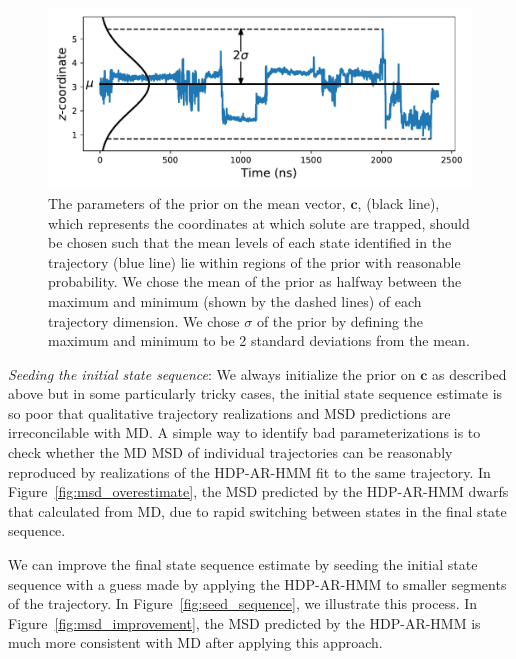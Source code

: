 \documentclass{article}
\begin{document}
  \begin{figure}[h]
  \centering
  \includegraphics[width=\textwidth]{prior_guesses.pdf}
  \caption{The parameters of the prior on the mean vector, $\mathbf{c}$, (black line), which
  represents the coordinates at which solute are trapped, should be chosen such
  that the mean levels of each state identified in the trajectory (blue line) lie within
  regions of the prior with reasonable probability. We chose the mean of the prior 
  as halfway between the maximum and minimum (shown by the dashed lines) of each trajectory dimension. We chose 
  $\sigma$ of the prior by defining the maximum and minimum to be 2 standard deviations
  from the mean.}\label{fig:prior_guesses}
  \end{figure}
  
  \textit{Seeding the initial state sequence}: We always initialize the prior on
  $\mathbf{c}$ as described above but in some 
  particularly tricky cases, the initial state sequence estimate is so poor that
  qualitative trajectory realizations and MSD predictions are irreconcilable with
  MD. A simple way to identify bad parameterizations is to check whether the MD 
  MSD of individual trajectories can be reasonably reproduced by realizations of
  the HDP-AR-HMM fit to the same trajectory. In Figure~\ref{fig:msd_overestimate},
  the MSD predicted by the HDP-AR-HMM dwarfs that calculated from MD, due to 
  rapid switching between states in the final state sequence.
  
  We can improve the final state sequence estimate by seeding the initial state 
  sequence with a guess made by applying the HDP-AR-HMM to smaller segments of the 
  trajectory. In Figure~\ref{fig:seed_sequence}, we illustrate this process. In
  Figure~\ref{fig:msd_improvement}, the MSD predicted by the HDP-AR-HMM is
  much more consistent with MD after applying this approach.
  
\end{document}
